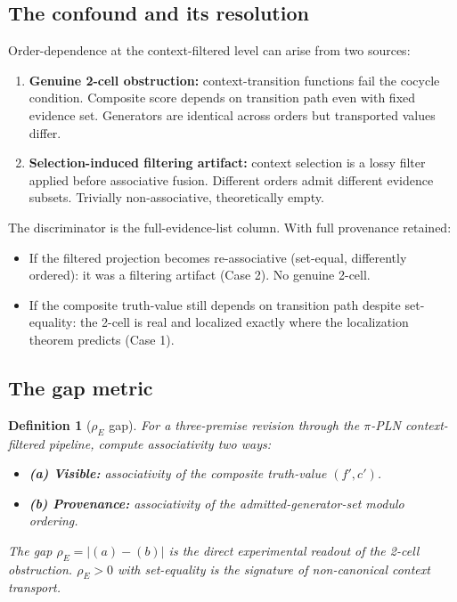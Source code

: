 \documentclass[11pt]{article}
\newtheorem{definition}{Definition}
\begin{document}
\subsection{The confound and its resolution}

Order-dependence at the context-filtered level can arise from two sources:
\begin{enumerate}
  \item \textbf{Genuine 2-cell obstruction:} context-transition functions fail the cocycle
  condition. Composite score depends on transition path even with fixed evidence set.
  Generators are identical across orders but transported values differ.

  \item \textbf{Selection-induced filtering artifact:} context selection is a lossy filter
  applied before associative fusion. Different orders admit different evidence subsets.
  Trivially non-associative, theoretically empty.
\end{enumerate}

The discriminator is the full-evidence-list column. With full provenance retained:
\begin{itemize}
  \item If the filtered projection becomes re-associative (set-equal, differently ordered):
    it was a filtering artifact (Case 2). No genuine 2-cell.
  \item If the composite truth-value still depends on transition path despite set-equality:
    the 2-cell is real and localized exactly where the localization theorem predicts (Case 1).
\end{itemize}

\subsection{The gap metric}

\begin{definition}[$\rho_E$ gap]
\label{def:rho-gap}
For a three-premise revision through the $\pi$-PLN context-filtered pipeline, compute
associativity two ways:
\begin{itemize}
  \item \textbf{(a) Visible:} associativity of the composite truth-value $(f', c')$.
  \item \textbf{(b) Provenance:} associativity of the admitted-generator-set modulo ordering.
\end{itemize}
The gap $\rho_E = |(a) - (b)|$ is the direct experimental readout of the 2-cell obstruction.
$\rho_E > 0$ with set-equality is the signature of non-canonical context transport.
\end{definition}
\end{document}
